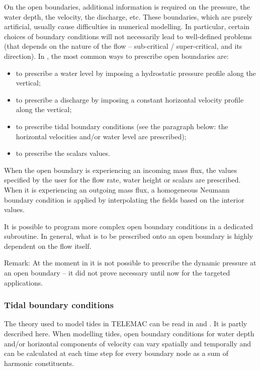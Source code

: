 On the open boundaries, additional information is required on the pressure,
the water depth, the velocity, the discharge, etc. These boundaries, which are
purely artificial, usually cause difficulties in numerical modelling.
In particular, certain choices of boundary conditions will not
necessarily lead to well-defined problems (that depends on the nature
of the flow -- sub-critical / super-critical, and its direction).
In , the most common ways to prescribe open boundaries are:
\begin{itemize}
\item to prescribe a water level by imposing a hydrostatic pressure profile along the vertical;
\item to prescribe a discharge by imposing a constant horizontal velocity profile along the vertical;
\item to prescribe tidal boundary conditions (see the paragraph below: the horizontal velocities and/or water level are prescribed);
\item to prescribe the scalars values.
\end{itemize}
When the open boundary is experiencing an incoming mass flux, the values specified by the user
for the flow rate, water height or scalars are prescribed. When it is experiencing an outgoing
mass flux, a homogeneous Neumann boundary condition is applied by interpolating the fields based
on the interior values.

It is possible to program more complex open boundary conditions in a dedicated subroutine.
In general, what is to be prescribed onto an open boundary is highly dependent on the flow itself.

\begin{CommentBlock}{Remark:}
At the moment in  it is not possible to prescribe the dynamic pressure at an open
boundary -- it did not prove necessary until now for the targeted applications.
\end{CommentBlock}


\subsubsection{Tidal boundary conditions}\label{tides}

The theory used to model tides in TELEMAC can be read in \cite{jmj} and
\cite{schureman71}. It is partly described here. When modelling tides, open
boundary conditions for water depth and/or horizontal components of velocity
can vary spatially and temporally and can be calculated at each time step for
every boundary node as a sum of harmonic constituents.

